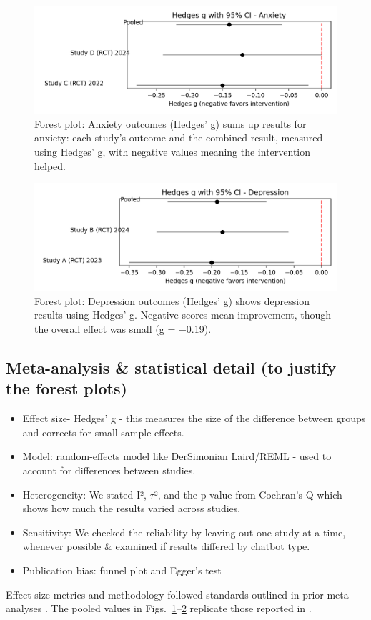\documentclass[sn-basic,authoryear]{sn-jnl}
\begin{document}
\begin{figure}
    \centering
    \includegraphics[width=1.0\linewidth]{chart (4).png}
    \caption{Forest plot: Anxiety outcomes (Hedges’ g) sums up results for anxiety: each study’s outcome and the combined result, measured using Hedges’ g, with negative values meaning the intervention helped.
}
    \label{fig:forestplot_depression}
\end{figure}

\begin{figure}[htbp]
    \centering
    \includegraphics[width=1.0\linewidth]{chart (3).png}
    \caption{Forest plot: Depression outcomes (Hedges’ g) shows depression results using Hedges’ g. Negative scores mean improvement, though the overall effect was small 
(g = −0.19).
 }
    \label{fig:forestplot_anxiety}
\end{figure}

\subsection{Meta-analysis \& statistical detail (to justify the forest plots)}
\begin{itemize}
    \item Effect size- Hedges' g - this measures the size of the difference between groups and corrects for small sample effects.
    \item Model:  random-effects model like DerSimonian Laird/REML - used to account for differences between studies.
    \item Heterogeneity: We stated I², $\tau$², and the p-value from Cochran’s Q which shows how much the results varied across studies.
    \item Sensitivity: We checked the reliability by leaving out one study at a time, whenever possible \& examined if results differed by chatbot type.
    \item Publication bias:  funnel plot and Egger’s test
\end{itemize}
Effect size metrics and methodology followed standards outlined in prior meta-analyses \cite{Borenstein2021}. The pooled values in Figs.~\ref{fig:forestplot_depression}–\ref{fig:forestplot_anxiety} replicate those reported in \cite{Zhong2024}.
\end{document}
